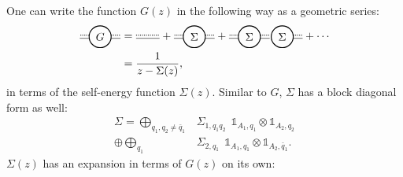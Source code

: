 \documentclass[aps,pra,reprint,superscriptaddress,twocolumn,notitlepage]{revtex4-1}
\numberwithin{equation}{section}
\begin{document}
One can write the function $G(z)$ in the following way as a geometric series:
%
\begin{equation}\label{eq:G_in_terms_of_sigma}
\begin{aligned}
    \tikz[baseline=-0.5ex]{
    \draw[densely dotted,thick] (0.35,0.05)--(0.65,0.05);
    \draw[densely dotted,thick] (-0.35,0.05)--(-0.65,0.05);
    \draw (0.35,-0.05)--(0.65,-0.05);
    \draw (-0.35,-0.05)--(-0.65,-0.05);
    \draw[thick] (0,0) circle (10pt) node[anchor=center] {$G$};
    }
    &=
   \tikz[baseline=-0.5ex]{
    \draw[densely dotted,thick] (-0.4,0.05)--(0.35,0.05);
    \draw (-0.4,-0.05)--(0.35,-0.05);
    }
    +
    \tikz[baseline=-0.5ex]{
    \draw[densely dotted,thick] (0.35,0.05)--(0.65,0.05);
    \draw[densely dotted,thick] (-0.35,0.05)--(-0.65,0.05);
    \draw (0.35,-0.05)--(0.65,-0.05);
    \draw (-0.35,-0.05)--(-0.65,-0.05);
    \draw[thick] (0,0) circle (10pt) node[anchor=center] {$\Sigma$};
    }
    +
    \tikz[baseline=-0.5ex]{
    \draw[densely dotted,thick] (0.35,0.05)--(0.65,0.05);
    \draw[densely dotted,thick] (-0.35,0.05)--(-0.65,0.05);
    \draw (0.35,-0.05)--(0.65,-0.05);
    \draw (-0.35,-0.05)--(-0.65,-0.05);
    \draw[thick] (0,0) circle (10pt) node[anchor=center] {$\Sigma$};
    \draw[thick] (1.05,0) circle (10pt) node[anchor=center] {$\Sigma$};
    \draw[densely dotted,thick] (1.4,0.05)--(1.7,0.05);
    \draw (1.4,-0.05)--(1.7,-0.05);
    }
    + \cdots  \\
      &= \frac{1}{z-\Sigma(z)},
\end{aligned}
\end{equation}
%
in terms of the self-energy function $\Sigma(z)$. Similar to $G$, $\Sigma$ has a block diagonal form as well:
\begin{equation}
\begin{aligned}
    \Sigma =  \bigoplus_{q_1,q_2\neq \bar{q}_1} & \Sigma_{1,q_1q_2} \ \ \mathbb{1}_{A_1,q_1} \otimes \mathbb{1}_{A_2,q_2} \\
     \oplus  \bigoplus_{q_1}\ \ \, & \Sigma_{2,q_1} \ \ \mathbb{1}_{A_1,q_1} \otimes \mathbb{1}_{A_2,\bar{q}_1}.
\end{aligned}
\end{equation}
$\Sigma(z)$ has an expansion in terms of $G(z)$ on its own:
%
\end{document}
